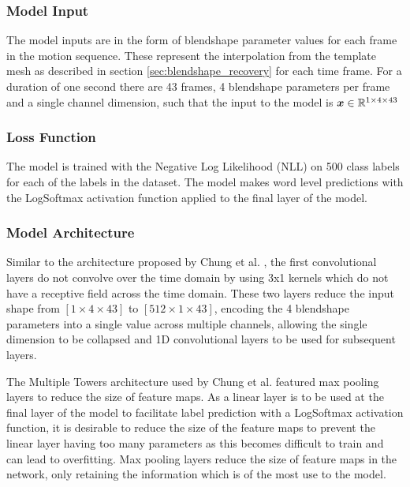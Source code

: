 \subsubsection{Model Input} \label{sec:classification_inputs}
The model inputs are in the form of blendshape parameter values for each frame in the motion sequence.
These represent the interpolation from the template mesh as described in section \ref{sec:blendshape_recovery} for each time frame.
For a duration of one second there are 43 frames, 4 blendshape parameters per frame and a single channel dimension, such that the input to the model is ${\boldsymbol{{x}}} \in \mathbb{R}^{1 \times 4 \times 43}$

\subsubsection{Loss Function}
The model is trained with the Negative Log Likelihood (NLL) on 500 class labels for each of the labels in the dataset.
The model makes word level predictions with the LogSoftmax activation function applied to the final layer of the model.

\subsubsection{Model Architecture} \label{sec:classification_model_arch}
Similar to the architecture proposed by Chung et al. \cite{Chung2016}, the first convolutional layers do not convolve over the time domain by using 3x1 kernels which do not have a receptive field across the time domain.
These two layers reduce the input shape from $[1 \times 4 \times 43]$ to $[512 \times 1 \times 43]$, encoding the 4 blendshape parameters into a single value across multiple channels, allowing the single dimension to be collapsed and 1D convolutional layers to be used for subsequent layers.

The Multiple Towers architecture used by Chung et al. featured max pooling layers to reduce the size of feature maps.
As a linear layer is to be used at the final layer of the model to facilitate label prediction with a LogSoftmax activation function, it is desirable to reduce the size of the feature maps to prevent the linear layer having too many parameters as this becomes difficult to train and can lead to overfitting.
Max pooling layers reduce the size of feature maps in the network, only retaining the information which is of the most use to the model.

